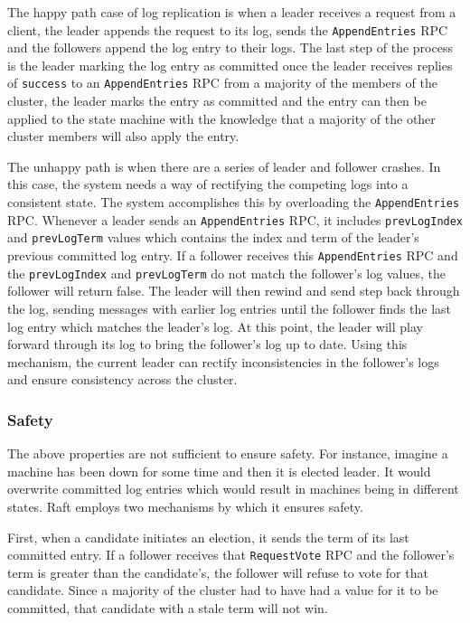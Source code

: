 The happy path case of log replication is when a leader receives a request from a client, the leader appends the request to its log, sends the \texttt{AppendEntries} RPC and the followers append the log entry to their logs.
The last step of the process is the leader marking the log entry as committed once the leader receives replies of \texttt{success} to an \texttt{AppendEntries} RPC from a majority of the members of the cluster, the leader marks the entry as committed and the entry can then be applied to the state machine with the knowledge that a majority of the other cluster members will also apply the entry.

The unhappy path is when there are a series of leader and follower crashes.
In this case, the system needs a way of rectifying the competing logs into a consistent state.
The system accomplishes this by overloading the \texttt{AppendEntries} RPC.
Whenever a leader sends an \texttt{AppendEntries} RPC, it includes \texttt{prevLogIndex} and \texttt{prevLogTerm} values which contains the index and term of the leader's previous committed log entry.
If a follower receives this \texttt{AppendEntries} RPC and the \texttt{prevLogIndex} and \texttt{prevLogTerm} do not match the follower's log values, the follower will return false.
The leader will then rewind and send step back through the log, sending messages with earlier log entries until the follower finds the last log entry which matches the leader's log.  At this point, the leader will play forward through its log to bring the follower's log up to date.
Using this mechanism, the current leader can rectify inconsistencies in the follower's logs and ensure consistency across the cluster.


\subsubsection{Safety}

The above properties are not sufficient to ensure safety.
For instance, imagine a machine has been down for some time and then it is elected leader.
It would overwrite committed log entries which would result in machines being in different states.
Raft employs two mechanisms by which it ensures safety.

First, when a candidate initiates an election, it sends the term of its last committed entry.
If a follower receives that \texttt{RequestVote} RPC and the follower's term is greater than the candidate's, the follower will refuse to vote for that candidate.
Since a majority of the cluster had to have had a value for it to be committed, that candidate with a stale term will not win.


